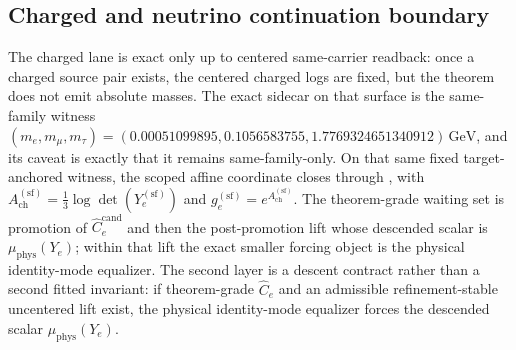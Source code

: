 \subsection{Charged and neutrino continuation boundary}

The charged lane is exact only up to centered same-carrier readback: once a charged source pair exists, the centered charged logs are fixed, but the theorem does not emit absolute masses. The exact sidecar on that surface is the same-family witness \((m_e,m_\mu,m_\tau)=(0.00051099895,0.1056583755,1.7769324651340912)\,\mathrm{GeV}\), and its caveat is exactly that it remains same-family-only. On that same fixed target-anchored witness, the scoped affine coordinate closes through , with \(A_{\mathrm{ch}}^{(\mathrm{sf})}=\tfrac13\log\det(Y_e^{(\mathrm{sf})})\) and \(g_e^{(\mathrm{sf})}=e^{A_{\mathrm{ch}}^{(\mathrm{sf})}}\). The theorem-grade waiting set is promotion of \(\widehat C_e^{\mathrm{cand}}\) and then the post-promotion lift whose descended scalar is \(\mu_{\mathrm{phys}}(Y_e)\); within that lift the exact smaller forcing object is the physical identity-mode equalizer.
The second layer is a descent contract rather than a second fitted invariant: if theorem-grade \(\widehat C_e\) and an admissible refinement-stable uncentered lift exist, the physical identity-mode equalizer forces the descended scalar \(\mu_{\mathrm{phys}}(Y_e)\).

